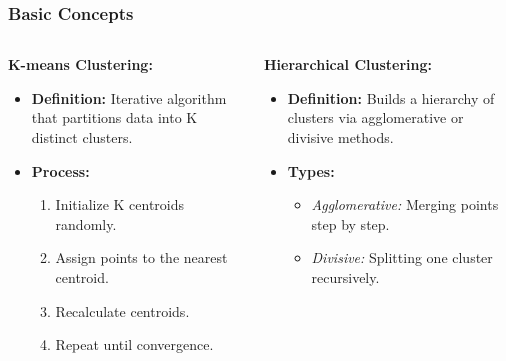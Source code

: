 \documentclass[aspectratio=169]{beamer}
\begin{document}
\begin{frame}[fragile]
    \frametitle{Basic Concepts}
    \begin{columns}
        \begin{column}{0.5\textwidth}
            \textbf{K-means Clustering:}
            \begin{itemize}
                \item \textbf{Definition:} Iterative algorithm that partitions data into K distinct clusters.
                \item \textbf{Process:}
                \begin{enumerate}
                    \item Initialize K centroids randomly.
                    \item Assign points to the nearest centroid.
                    \item Recalculate centroids.
                    \item Repeat until convergence.
                \end{enumerate}
            \end{itemize}
        \end{column}
        \begin{column}{0.5\textwidth}
            \textbf{Hierarchical Clustering:}
            \begin{itemize}
                \item \textbf{Definition:} Builds a hierarchy of clusters via agglomerative or divisive methods.
                \item \textbf{Types:}
                \begin{itemize}
                    \item \textit{Agglomerative:} Merging points step by step.
                    \item \textit{Divisive:} Splitting one cluster recursively.
                \end{itemize}
            \end{itemize}
        \end{column}
    \end{columns}
\end{frame}
\end{document}
